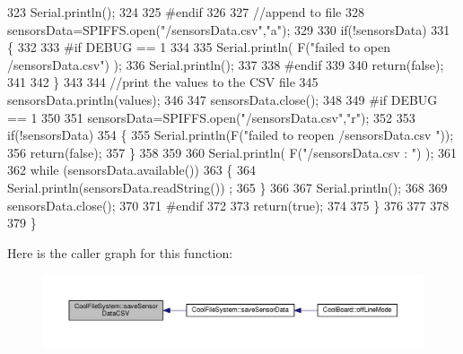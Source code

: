 \begin{DoxyCode}
323         Serial.println();
324     
325 \textcolor{preprocessor}{    #endif}
326 
327         \textcolor{comment}{//append to file}
328         sensorsData=SPIFFS.open(\textcolor{stringliteral}{"/sensorsData.csv"},\textcolor{stringliteral}{"a"});
329         
330         \textcolor{keywordflow}{if}(!sensorsData)
331         \{
332         
333 \textcolor{preprocessor}{        #if DEBUG == 1}
334             
335             Serial.println( F(\textcolor{stringliteral}{"failed to open /sensorsData.csv"}) );
336             Serial.println();
337 
338 \textcolor{preprocessor}{        #endif}
339             
340             \textcolor{keywordflow}{return}(\textcolor{keyword}{false});
341         
342         \}
343 
344         \textcolor{comment}{//print the values to the CSV file}
345         sensorsData.println(values);
346         
347         sensorsData.close();
348 
349 \textcolor{preprocessor}{    #if DEBUG == 1}
350 
351         sensorsData=SPIFFS.open(\textcolor{stringliteral}{"/sensorsData.csv"},\textcolor{stringliteral}{"r"});
352         
353         \textcolor{keywordflow}{if}(!sensorsData)
354         \{
355             Serial.println(F(\textcolor{stringliteral}{"failed to reopen /sensorsData.csv "}));
356             \textcolor{keywordflow}{return}(\textcolor{keyword}{false});      
357         \}
358 
359         
360         Serial.println( F(\textcolor{stringliteral}{"/sensorsData.csv : "}) );
361 
362         \textcolor{keywordflow}{while} (sensorsData.available()) 
363         \{
364             Serial.println(sensorsData.readString()) ;
365         \}
366         
367         Serial.println();
368         
369         sensorsData.close();
370         
371 \textcolor{preprocessor}{    #endif      }
372         
373         \textcolor{keywordflow}{return}(\textcolor{keyword}{true});
374     
375     \}   
376 
377 
378 
379 \}
\end{DoxyCode}
Here is the caller graph for this function\+:\nopagebreak
\begin{figure}[H]
\begin{center}
\leavevmode
\includegraphics[width=350pt]{db/d0c/class_cool_file_system_ab78704d5d21ce10fc6f1138ab5ab46c8_icgraph}
\end{center}
\end{figure}
\mbox{\label{class_cool_file_system_adfa8e2e80641ae6f0cceabd348a9b841}} 
